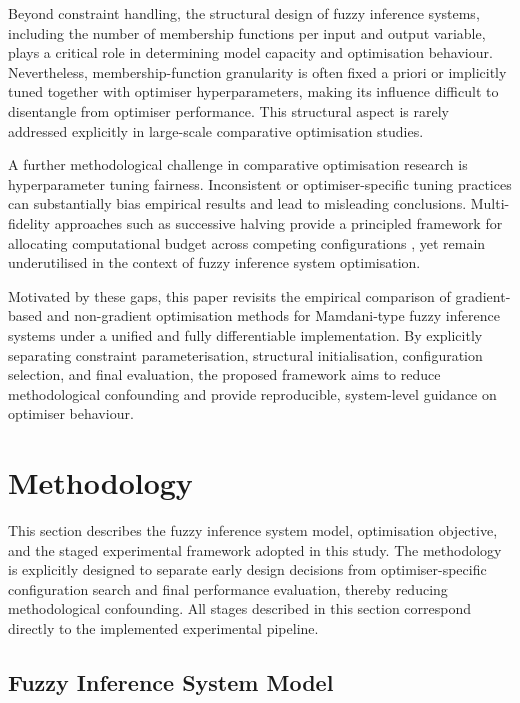 \documentclass[a4paper,12pt,oneside]{article}
\begin{document}
Beyond constraint handling, the structural design of fuzzy inference systems,
including the number of membership functions per input and output variable,
plays a critical role in determining model capacity and optimisation behaviour.
Nevertheless, membership-function granularity is often fixed a priori or
implicitly tuned together with optimiser hyperparameters, making its influence
difficult to disentangle from optimiser performance.
This structural aspect is rarely addressed explicitly in large-scale
comparative optimisation studies.

A further methodological challenge in comparative optimisation research is
hyperparameter tuning fairness.
Inconsistent or optimiser-specific tuning practices can substantially bias
empirical results and lead to misleading conclusions.
Multi-fidelity approaches such as successive halving provide a principled
framework for allocating computational budget across competing configurations
\cite{jamieson2016sh}, yet remain underutilised in the context of fuzzy inference
system optimisation.

Motivated by these gaps, this paper revisits the empirical comparison of
gradient-based and non-gradient optimisation methods for Mamdani-type fuzzy
inference systems under a unified and fully differentiable implementation.
By explicitly separating constraint parameterisation, structural
initialisation, configuration selection, and final evaluation, the proposed
framework aims to reduce methodological confounding and provide reproducible,
system-level guidance on optimiser behaviour.

\section{Methodology}\label{sec:method}

This section describes the fuzzy inference system model, optimisation objective,
and the staged experimental framework adopted in this study.
The methodology is explicitly designed to separate early design decisions from
optimiser-specific configuration search and final performance evaluation, thereby
reducing methodological confounding.
All stages described in this section correspond directly to the implemented
experimental pipeline.

\subsection{Fuzzy Inference System Model}
\end{document}
